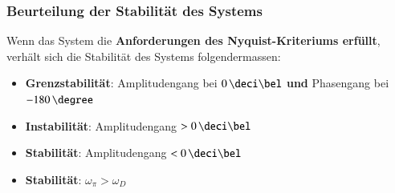 \subsubsection{Beurteilung der Stabilität des Systems}

Wenn das System die \textbf{Anforderungen des Nyquist-Kriteriums erfüllt}, verhält sich die Stabilität des Systems folgendermassen:

\begin{itemize}
    \item \textbf{Grenzstabilität}: Amplitudengang bei $0 \, \deci \bel$ \textbf{und} Phasengang bei $-180 \, \degree$
    \item \textbf{Instabilität}: Amplitudengang $>0 \, \deci \bel$ %
    \item \textbf{Stabilität}: Amplitudengang $<0 \, \deci \bel$ %
    \item \textbf{Stabilität}: $\omega_{\pi} > \omega_D$  %
\end{itemize}


